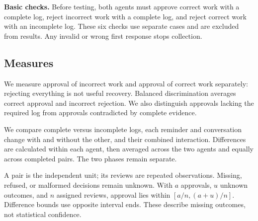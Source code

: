 \textbf{Basic checks.} Before testing, both agents must approve correct work with
a complete log, reject incorrect work with a complete log, and reject correct
work with an incomplete log. These six checks use separate cases and are
excluded from results. Any invalid or wrong first response stops collection.

\subsection{Measures}
We measure approval of incorrect work and approval of correct work separately:
rejecting everything is not useful recovery. Balanced discrimination averages
correct approval and incorrect rejection. We also distinguish approvals lacking
the required log from approvals contradicted by complete evidence.

We compare complete versus incomplete logs, each reminder and conversation
change with and without the other, and their combined interaction. Differences
are calculated within each agent, then averaged across the two agents and
equally across completed pairs. The two phases remain separate.

A pair is the independent unit; its reviews are repeated observations.
Missing, refused, or malformed decisions remain unknown. With $a$ approvals,
$u$ unknown outcomes, and $n$ assigned reviews, approval lies within
$[a/n,(a+u)/n]$. Difference bounds use opposite interval ends. These describe
missing outcomes, not statistical confidence.

